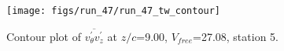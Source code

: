 \begin{figure}[H]
\centering
\texttt{[image: figs/run\_47/run\_47\_tw\_contour]}
\caption{Contour plot of $\overline{v_{\theta}^{\prime} v_{z}^{\prime}}$ at $z/c$=9.00, $V_{free}$=27.08, station 5.}
\label{fig:run_47_tw_contour}
\end{figure}


